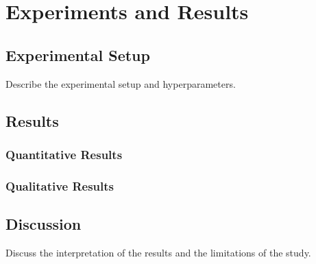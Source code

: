\chapter{Experiments and Results}
\label{ch:result}

\section{Experimental Setup}

Describe the experimental setup and hyperparameters.

\section{Results}

\subsection{Quantitative Results}

\subsection{Qualitative Results}

\section{Discussion}

Discuss the interpretation of the results and the limitations of the study.
